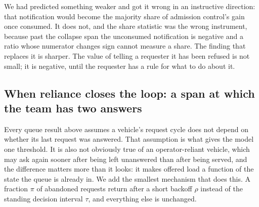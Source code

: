 \documentclass[11pt]{article}
\begin{document}
We had predicted something weaker and got it wrong in an instructive direction: that notification would become the majority share of admission control's gain once consumed. It does not, and the share statistic was the wrong instrument, because past the collapse span the unconsumed notification is negative and a ratio whose numerator changes sign cannot measure a share. The finding that replaces it is sharper. The value of telling a requester it has been refused is not small; it is negative, until the requester has a rule for what to do about it.

\subsection{When reliance closes the loop: a span at which the team has two answers}
\label{subsec:band}

Every queue result above assumes a vehicle's request cycle does not depend on whether its last request was answered. That assumption is what gives the model one threshold. It is also not obviously true of an operator-reliant vehicle, which may ask again sooner after being left unanswered than after being served, and the difference matters more than it looks: it makes offered load a function of the state the queue is already in. We add the smallest mechanism that does this. A fraction $\pi$ of abandoned requests return after a short backoff $\rho$ instead of the standing decision interval $\tau$, and everything else is unchanged.
\end{document}
